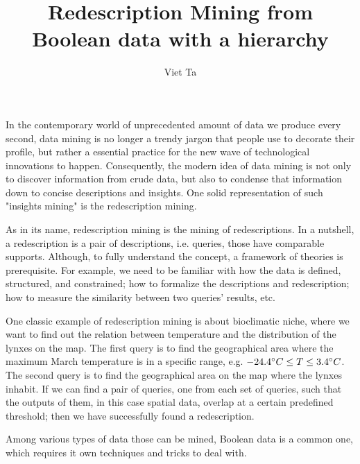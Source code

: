 \documentclass[12pt,a4paper,draft]{article}
\author{Viet Ta}
\title{Redescription Mining from Boolean data with a hierarchy}
\begin{document}
\maketitle

In the contemporary world of unprecedented amount of data we produce every second, data mining is no longer a trendy jargon that people use to decorate their profile, but rather a essential practice for the new wave of technological innovations to happen. Consequently, the modern idea of data mining is not only to discover information from crude data, but also to condense that information down to concise descriptions and insights. One solid representation of such "insights mining" is the redescription mining.


As in its name, redescription mining is the mining of redescriptions. In a nutshell, a redescription is a pair of descriptions, i.e. queries, those have comparable supports. Although, to fully understand the concept, a framework of theories is prerequisite. For example, we need to be familiar with how the data is defined, structured, and constrained; how to formalize the descriptions and redescription; how to measure the similarity between two queries’ results, etc.

One classic example of redescription mining is about bioclimatic niche, where we want to find out the relation between temperature and the distribution of the lynxes on the map. The first query is to find the geographical area where the maximum March temperature is in a specific range, e.g. \(-24.4 \degree C \leq T \leq 3.4\degree C\). The second query is to find the geographical area on the map where the lynxes inhabit. If we can find a pair of queries, one from each set of queries, such that the outputs of them, in this case spatial data, overlap at a certain predefined threshold; then we have successfully found a redescription.

Among various types of data those can be mined, Boolean data is a common one, which requires it own techniques and tricks to deal with.
\end{document}
